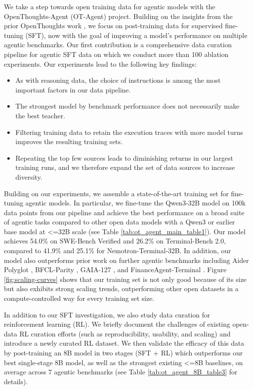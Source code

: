 \documentclass{article}
\begin{document}
We take a step towards open training data for agentic models with the OpenThoughts-Agent (OT-Agent) project.
Building on the insights from the prior OpenThoughts work \citep{guha2025openthoughtsdatarecipesreasoning}, we focus on post-training data for supervised fine-tuning (SFT), now with the goal of improving a model’s performance on multiple agentic benchmarks.
Our first contribution is a comprehensive data curation pipeline for agentic SFT data on which we conduct more than 100 ablation experiments.
Our experiments lead to the following key findings:
\begin{itemize}[topsep=0pt, itemsep=2pt, parsep=0pt, leftmargin=5.5mm]
\item As with reasoning data, the choice of instructions is among the most important factors in our data pipeline.
\item The strongest model by benchmark performance does not necessarily make the best teacher.
\item Filtering training data to retain the execution traces with more model turns improves the resulting training sets.
\item Repeating the top few sources leads to diminishing returns in our largest training runs, and we therefore expand the set of data sources to increase diversity.
\end{itemize}



Building on our experiments, we assemble a state-of-the-art training set for fine-tuning agentic models.
In particular, we fine-tune the Qwen3-32B model on 100k data points from our pipeline and achieve the best performance on a broad suite of agentic tasks compared to other open data models with a Qwen3 or earlier base model at <=32B scale (see Table \ref{tab:ot_agent_main_table1}).
Our model achieves 54.0\% on SWE-Bench Verified and 26.2\% on Terminal-Bench 2.0, compared to 41.9\% and 25.1\% for Nemotron-Terminal-32B.
In addition, our model also outperforms prior work on further agentic benchmarks including Aider Polyglot \citep{aiderpolyglot2024}, BFCL-Parity \citep{patil2025bfcl}, GAIA-127 \citep{mialon2023gaia}, and FinanceAgent-Terminal \citep{valsai2024financeagent}. 
Figure \ref{fig:scaling-curves} shows that our training set is not only good because of its size but also exhibits strong scaling trends, outperforming other open datasets in a compute-controlled way for every training set size.

In addition to our SFT investigation, we also study data curation for reinforcement learning (RL).
We briefly document the challenges of existing open-data RL curation efforts (such as reproducibility, usability, and scaling) and introduce a newly curated RL dataset. We then validate the efficacy of this data by post-training an 8B model in two stages (SFT + RL) which outperforms our best single-stage 8B model, as well as the strongest existing <=8B baselines, on average across 7 agentic benchmarks (see Table \ref{tab:ot_agent_8B_table3} for details).
\end{document}
